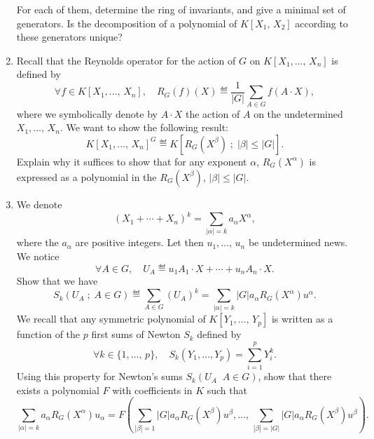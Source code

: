 \begin{exo}
\begin{enumerate}
\begin{equation*}
\end{equation*}
For each of them, determine the ring of invariants, and give a minimal set of generators. Is the decomposition of a polynomial of $ K[X_1, \, X_2] $ according to these generators unique?
\item {} Recall that the Reynolds operator for the action of $G$ on $ K[X_1, \ldots, \, X_n] $ is defined by
\begin{equation*}
\forall f \in K[X_1, \ldots, \, X_n], \quad R_G (f) (X) \eqdef \frac{1}{|G|} \sum_{A \in G}{f(A \cdot X)},
\end{equation*}
where we symbolically denote by $ A \cdot X $ the action of $ A $ on the undetermined $ X_1, \ldots, \, X_n $. We want to show the following result:
\begin{equation*}
K[X_1, \ldots, \, X_n]^G \eqdef K \left[R_G (X^\beta) \; ; \; | \beta | \leq |G| \right].
\end{equation*}
Explain why it suffices to show that for any exponent $ \alpha $, $ R_G (X^\alpha) $ is expressed as a polynomial in the $ R_G (X^\beta) $, $ | \beta | \leq |G| $.
\item {} We denote
\begin{equation*}
(X_1 + \cdots + X_n)^k = \sum_{| \alpha | = k}{a_\alpha X^\alpha},
\end{equation*}
where the $ a_\alpha $ are positive integers. Let then $ u_1, \ldots, \, u_n $ be undetermined news. We notice
\begin{equation*}
\forall A \in G, \quad U_A \eqdef u_1 A_1 \cdot X + \cdots + u_n A_n \cdot X.
\end{equation*}
Show that we have
\begin{equation*}
S_k (U_A \;; \; A \in G) \eqdef \sum_{A \in G}{(U_A)^k} = \sum_{| \alpha | = k}{|G| a_\alpha R_G (X^\alpha) u^\alpha}.
\end{equation*}
We recall that any symmetric polynomial of $ K[Y_1, \ldots, \, Y_p] $ is written as a function of the $ p $ first sums of Newton $ S_k $ defined by
\begin{equation*}
\forall k \in \{1, \ldots, \, p\}, \quad S_k (Y_1, \ldots, Y_p) = \sum_{i = 1}^p{Y_i^k}.
\end{equation*}
Using this property for Newton's sums $ S_k (U_A \; \; A \in G) $, show that there exists a polynomial $ F $ with coefficients in $K$ such that
\begin{equation*}
\sum_{| \alpha | = k}{a_\alpha R_G (X^\alpha) u_\alpha} = F \left(\sum_{| \beta | = 1}{|G| a_\alpha R_G (X^\beta) u^\beta}, \ldots, \, \sum_{| \beta | = |G|}{|G| a_\alpha R_G (X^\beta) u^\beta} \right).

\end{equation*}
\end{enumerate}
\end{exo}

